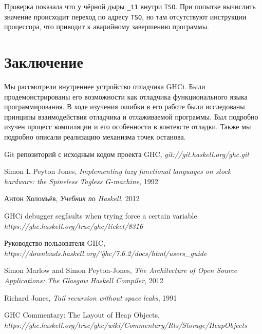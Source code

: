 \documentclass[fontsize=14pt, paper=a4, pagesize, DIV=calc]{scrartcl}
\def\code#1{\texttt{#1}}
\begin{document}
Проверка показала что у чёрной дыры \code{\_t1} внутри \code{TSO}. При попытке
вычислить значение происходит переход по адресу \code{TSO}, но там отсутствуют
инструкции процессора, что приводит к аварийному завершению программы.

\section{Заключение}

Мы рассмотрели внутреннее устройство отладчика GHCi. Были продемонстрированы
его возможности как отладчика функционального языка программирования. В ходе
изучения ошибки в его работе были исследованы принципы взаимодействия отладчика
и отлаживаемой программы. Был подробно изучен процесс компиляции и его
особенности в контексте отладки. Также мы подробно описали реализацию механизма
точек останова.

\begin{thebibliography}{9}

Git репозиторий с исходным кодом проекта GHC,
\emph{git://git.haskell.org/ghc.git}

Simon L Peyton Jones,
\emph{Implementing lazy functional languages on stock hardware: the Spineless
Tagless G-machine}, 1992

Антон Холомьёв,
\emph{Учебник по Haskell}, 2012

GHCi debugger segfaults when trying force a certain variable
\emph{https://ghc.haskell.org/trac/ghc/ticket/8316}

Руководство пользователя GHC,\\
\emph{https://downloads.haskell.org/\char`\~ghc/7.6.2/docs/html/users\_guide}

Simon Marlow and Simon Peyton-Jones,
\emph{The Architecture of Open Source Applications: The Glasgow Haskell Compiler},
2012

Richard Jones,
\emph{Tail recursion without space leaks},
1991

GHC Commentary: The Layout of Heap Objects,
\emph{https://ghc.haskell.org/trac/ghc/wiki/Commentary/Rts/Storage/HeapObjects}

\end{thebibliography}
\end{document}
